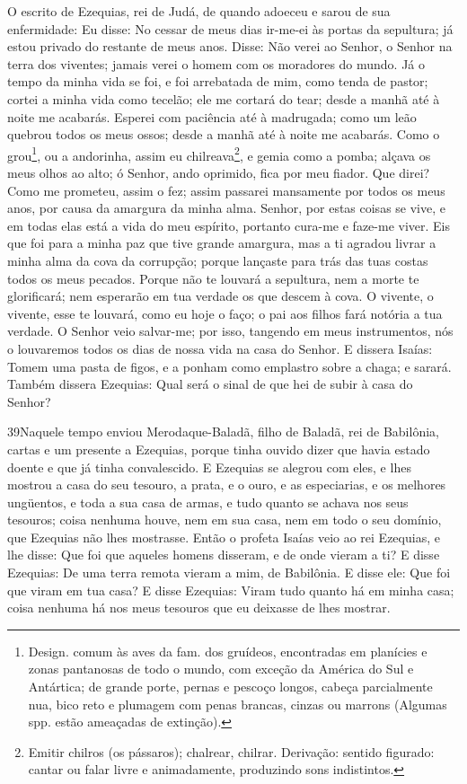 O escrito de Ezequias, rei de Judá, de quando adoeceu e sarou de
sua enfermidade: Eu disse: No cessar de meus dias ir-me-ei às
portas da sepultura; já estou privado do restante de meus anos.
Disse: Não verei ao Senhor, o Senhor na terra dos viventes;
jamais verei o homem com os moradores do mundo. Já o tempo da
minha vida se foi, e foi arrebatada de mim, como tenda de pastor;
cortei a minha vida como tecelão; ele me cortará do tear; desde a
manhã até à noite me acabarás. Esperei com paciência até à
madrugada; como um leão quebrou todos os meus ossos; desde a manhã
até à noite me acabarás. Como o grou\footnote{Design. comum
às aves da fam. dos gruídeos, encontradas em planícies e zonas
pantanosas de todo o mundo, com exceção da América do Sul e
Antártica; de grande porte, pernas e pescoço longos, cabeça
parcialmente nua, bico reto e plumagem com penas brancas, cinzas ou
marrons (Algumas spp. estão ameaçadas de extinção).}, ou a
andorinha, assim eu chilreava\footnote{Emitir chilros (os pássaros);
chalrear, chilrar. Derivação: sentido figurado: cantar ou falar
livre e animadamente, produzindo sons indistintos.}, e gemia como a
pomba; alçava os meus olhos ao alto; ó Senhor, ando oprimido, fica
por meu fiador. Que direi? Como me prometeu, assim o fez;
assim passarei mansamente por todos os meus anos, por causa da
amargura da minha alma. Senhor, por estas coisas se vive, e
em todas elas está a vida do meu espírito, portanto cura-me e
faze-me viver. Eis que foi para a minha paz que tive grande
amargura, mas a ti agradou livrar a minha alma da cova da corrupção;
porque lançaste para trás das tuas costas todos os meus pecados.
Porque não te louvará a sepultura, nem a morte te
glorificará; nem esperarão em tua verdade os que descem à cova.
O vivente, o vivente, esse te louvará, como eu hoje o faço; o
pai aos filhos fará notória a tua verdade. O Senhor veio
salvar-me; por isso, tangendo em meus instrumentos, nós o louvaremos
todos os dias de nossa vida na casa do Senhor. E dissera
Isaías: Tomem uma pasta de figos, e a ponham como emplastro sobre a
chaga; e sarará. Também dissera Ezequias: Qual será o sinal
de que hei de subir à casa do Senhor?

\medskip

\lettrine{39}{}Naquele tempo enviou Merodaque-Baladã, filho de
Baladã, rei de Babilônia, cartas e um presente a Ezequias, porque
tinha ouvido dizer que havia estado doente e que já tinha
convalescido. E Ezequias se alegrou com eles, e lhes mostrou a
casa do seu tesouro, a prata, e o ouro, e as especiarias, e os
melhores ungüentos, e toda a sua casa de armas, e tudo quanto se
achava nos seus tesouros; coisa nenhuma houve, nem em sua casa, nem
em todo o seu domínio, que Ezequias não lhes mostrasse. Então o
profeta Isaías veio ao rei Ezequias, e lhe disse: Que foi que
aqueles homens disseram, e de onde vieram a ti? E disse Ezequias: De
uma terra remota vieram a mim, de Babilônia. E disse ele: Que
foi que viram em tua casa? E disse Ezequias: Viram tudo quanto há em
minha casa; coisa nenhuma há nos meus tesouros que eu deixasse de
lhes mostrar.


